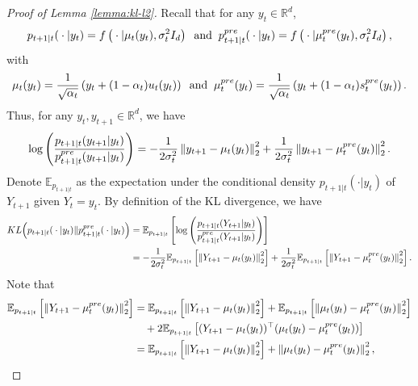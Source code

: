 \documentclass[10pt,a4paper]{amsart}
\newcommand{\R}{\mathbb{R}}
\newcommand{\bracket}[1]{\left[ #1 \right]}
\newcommand{\parenthesis}[1]{\left( #1 \right)}
\newcommand{\norm}[1]{\left \|#1\right \|}
\newcommand{\E}{\mathbb{E}}
\begin{document}
    \begin{proof}[Proof of Lemma \ref{lemma:kl-l2}]
        Recall that for any $y_t \in \R^d$,
        \begin{align*}
           {p_{t+1\vert t}({}\cdot{}\vert y_{t})} = f\parenthesis{{}\cdot{}\vert\mu_t(y_t), \sigma_{t}^{2} I_d} \;\; \text{and}\;\; p_{t+1\vert t}^{\rm pre}({}\cdot{}\vert y_{t}) = f\parenthesis{{}\cdot{}\vert\mu_t^{\rm pre}(y_t), \sigma_{t}^{2} I_d},
        \end{align*}
        with 
        \begin{align*}
            \mu_t(y_t) = \frac{1}{\sqrt{\alpha_t}}\parenthesis{y_t + (1 - \alpha_t)u_t(y_t)} \;\; \text{and} \;\; \mu_t^{\rm pre}(y_t) = \frac{1}{\sqrt{\alpha_t}}\parenthesis{y_t + (1 - \alpha_t)s^{\rm pre}_t(y_t)}.
        \end{align*}
        Thus, for any $y_t, y_{t+1} \in \R^d$, we have
        \begin{align*}
            \log \left(\frac{p_{t+1\vert t}(y_{t+1} \vert y_t)}{p^{\rm pre}_{t+1\vert t}(y_{t+1} \vert y_t)} \right)= -\frac{1}{2\sigma_t^2}\norm{y_{t+1} - \mu_t(y_t)}_2^2 + \frac{1}{2\sigma_t^2}\norm{y_{t+1} - \mu_t^{\rm pre}(y_t)}_2^2. 
        \end{align*}
        Denote $\E_{p_{t+1\vert t}}$ as the expectation under the conditional density $p_{t+1\vert t}(\cdot\vert y_t)$ of $Y_{t+1}$ given $Y_t = y_t$. By definition of the KL divergence, we have %
        \begin{align}
             {\rm KL}\Big(p_{t+1\vert t}({}\cdot{}\vert y_t) \|p_{t+1\vert t}^{\rm pre}({}\cdot{}\vert y_t)\Big) & =\E_{p_{t+1\vert t}}\bracket{\log \left(\frac{p_{t+1\vert t}(Y_{t+1} \vert y_t)}{p^{\rm pre}_{t+1\vert t}(Y_{t+1} \vert y_t)}\right)} \nonumber\\ & = -\frac{1}{2\sigma_t^2}\E_{p_{t+1\vert t}}\bracket{\norm{Y_{t+1} - \mu_t(y_t)}_2^2} +  \frac{1}{2\sigma_t^2}\E_{p_{t+1\vert t}}\bracket{\norm{Y_{t+1} - \mu_t^{\rm pre}(y_t)}_2^2}. \label{eq:kl-simple}
        \end{align}
        Note that 
        \begin{align*}
            \E_{p_{t+1\vert t}}\bracket{\norm{Y_{t+1} - \mu_t^{\rm pre}(y_t)}_2^2} & = \E_{p_{t+1\vert t}}\bracket{\norm{Y_{t+1} - \mu_t(y_t)}_2^2} + \E_{p_{t+1\vert t}}\bracket{\norm{\mu_t(y_t) - \mu_t^{\rm pre}(y_t)}_2^2} \\ & \quad + 2\E_{p_{t+1\vert t}}\bracket{(Y_{t+1} - \mu_t(y_t))^\top(\mu_t(y_t) -\mu_t^{\rm pre}(y_t))} \\ & = \E_{p_{t+1\vert t}}\bracket{\norm{Y_{t+1} - \mu_t(y_t)}_2^2} + \norm{\mu_t(y_t) - \mu_t^{\rm pre}(y_t)}_2^2,

\end{align*}
\end{proof}
\end{document}
